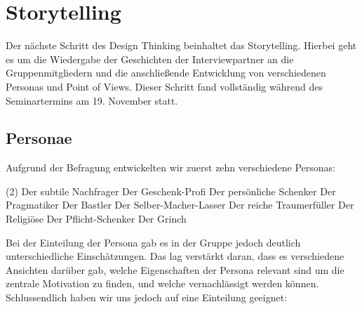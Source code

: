 \documentclass[12pt,ngerman, fleqn]{book} %
\begin{document}
\chapter{Storytelling}
Der nächste Schritt des Design Thinking beinhaltet das Storytelling. Hierbei geht es um die Wiedergabe der Geschichten der Interviewpartner an die Gruppenmitgliedern und die anschließende Entwicklung von verschiedenen Personas und Point of Views. Dieser Schritt fand vollständig während des Seminartermins am 19. November statt.

\section{Personae}
Aufgrund der Befragung entwickelten wir zuerst zehn verschiedene Personas:

\begin{tasks}(2)
    \task Der subtile Nachfrager
    \task Der Geschenk-Profi
    \task Der persönliche Schenker
    \task Der Pragmatiker
    \task Der Bastler
    \task Der Selber-Macher-Lasser
    \task Der reiche Traumerfüller
    \task Der Religiöse
    \task Der Pflicht-Schenker
    \task Der Grinch
\end{tasks}

Bei der Einteilung der Persona gab es in der Gruppe jedoch deutlich unterschiedliche Einschätzungen. Das lag verstärkt daran, dass es verschiedene Ansichten darüber gab, welche Eigenschaften der Persona relevant sind um die zentrale Motivation zu finden, und welche vernachlässigt werden können. Schlussendlich haben wir uns jedoch auf eine Einteilung geeignet:
\end{document}
